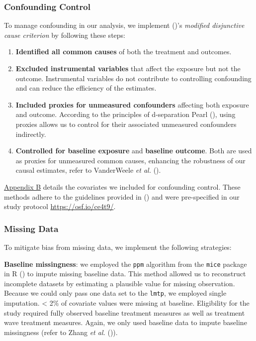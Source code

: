 \documentclass[
  single column]{article}
\providecommand{\tightlist}{%
  \setlength{\itemsep}{0pt}\setlength{\parskip}{0pt}}\usepackage{longtable,booktabs,array}
\begin{document}
\subsubsection{Confounding Control}\label{confounding-control}

To manage confounding in our analysis, we implement
()'s \emph{modified
disjunctive cause criterion} by following these steps:

\begin{enumerate}
\def\labelenumi{\arabic{enumi}.}
\tightlist
\item
  \textbf{Identified all common causes} of both the treatment and
  outcomes.
\item
  \textbf{Excluded instrumental variables} that affect the exposure but
  not the outcome. Instrumental variables do not contribute to
  controlling confounding and can reduce the efficiency of the
  estimates.
\item
  \textbf{Included proxies for unmeasured confounders} affecting both
  exposure and outcome. According to the principles of d-separation
  Pearl (), using proxies allows us to
  control for their associated unmeasured confounders indirectly.
\item
  \textbf{Controlled for baseline exposure} and \textbf{baseline
  outcome}. Both are used as proxies for unmeasured common causes,
  enhancing the robustness of our causal estimates, refer to VanderWeele
  \emph{et al.} ().
\end{enumerate}

\hyperref[appendix-demographics]{Appendix B} details the covariates we
included for confounding control. These methods adhere to the guidelines
provided in () and
were pre-specified in our study protocol \url{https://osf.io/ce4t9/}.

\subsubsection{Missing Data}\label{missing-data}

To mitigate bias from missing data, we implement the following
strategies:

\textbf{Baseline missingness}: we employed the \texttt{ppm} algorithm
from the \texttt{mice} package in R () to impute missing baseline data. This method allowed us to
reconstruct incomplete datasets by estimating a plausible value for
missing observation. Because we could only pass one data set to the
\texttt{lmtp}, we employed single imputation. \textless{} 2\% of
covariate values were missing at baseline. Eligibility for the study
required fully observed baseline treatment measures as well as treatment
wave treatment measures. Again, we only used baseline data to impute
baseline missingness (refer to Zhang \emph{et al.}
()).
\end{document}
